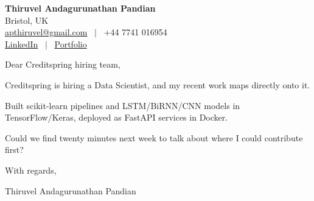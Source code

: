\documentclass[11pt,a4paper]{article}
\begin{document}
\raggedright
\pagestyle{empty}

\begin{center}
    {\LARGE \color{linkblue} \textbf{Thiruvel Andagurunathan Pandian}}\\[0.2cm]
    Bristol, UK \\
    \href{mailto:apthiruvel@gmail.com}{apthiruvel@gmail.com} \ $|$ \ +44 7741 016954 \\
\href{https://www.linkedin.com/in/thiruvel-a-p/}{LinkedIn} \ $|$ \ \href{https://thiruvel-ap.github.io/PersonalPortfolio/}{Portfolio}
\end{center}

\vspace{0.4cm}

\noindent
Dear Creditspring hiring team,

Creditspring is hiring a Data Scientist, and my recent work maps directly onto it.

Built scikit-learn pipelines and LSTM/BiRNN/CNN models in TensorFlow/Keras, deployed as FastAPI services in Docker.

Could we find twenty minutes next week to talk about where I could contribute first?

\vspace{0.5cm}

With regards,

Thiruvel Andagurunathan Pandian
\end{document}

